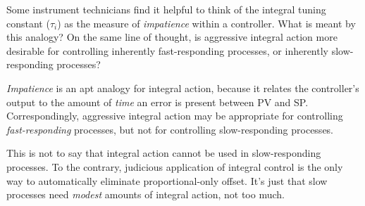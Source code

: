 

Some instrument technicians find it helpful to think of the integral tuning constant ($\tau_i$) as the measure of {\it impatience} within a controller.  What is meant by this analogy?  On the same line of thought, is aggressive integral action more desirable for controlling inherently fast-responding processes, or inherently slow-responding processes?







{\it Impatience} is an apt analogy for integral action, because it relates the controller's output to the amount of {\it time} an error is present between PV and SP.  Correspondingly, aggressive integral action may be appropriate for controlling {\it fast-responding} processes, but not for controlling slow-responding processes.







This is not to say that integral action cannot be used in slow-responding processes.  To the contrary, judicious application of integral control is the only way to automatically eliminate proportional-only offset.  It's just that slow processes need {\it modest} amounts of integral action, not too much.




